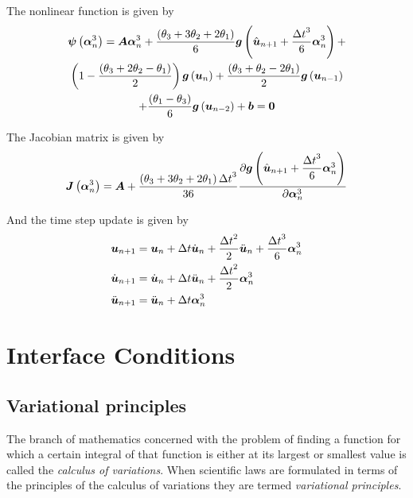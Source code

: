 The nonlinear function is given by
\begin{multline}
  \fnof{\vectr{\psi}}{\vectr{\alpha}^{3}_{n}}=\matr{A}\vectr{\alpha}^{3}_{n}+\dfrac{\pbrac{\theta_{3}+3\theta_{2}+2\theta_{1}}}{6}
  \fnof{\vectr{g}}{\hat{\vectr{u}}_{n+1}+\dfrac{{\Delta t}^{3}}{6}\vectr{\alpha}^{3}_{n}}+\\
  \pbrac{1-\dfrac{\pbrac{\theta_{3}+2\theta_{2}-\theta_{1}}}{2}}\fnof{\vectr{g}}{\vectr{u}_{n}}
  +\dfrac{\pbrac{\theta_{3}+\theta_{2}-2\theta_{1}}}{2}\fnof{\vectr{g}}{\vectr{u}_{n-1}} \\
  +\dfrac{\pbrac{\theta_{1}-\theta_{3}}}{6}\fnof{\vectr{g}}{\vectr{u}_{n-2}}
  +\vectr{b}=\vectr{0}
\end{multline}

The Jacobian matrix is given by
\begin{equation}
  \fnof{\matr{J}}{\vectr{\alpha}^{3}_{n}}=\matr{A}+\dfrac{\pbrac{\theta_{3}+3\theta_{2}+2\theta_{1}}{\Delta t}^{3}}{36}
  \delby{\fnof{\vectr{g}}{\hat{\vectr{u}}_{n+1}+\dfrac{{\Delta t}^{3}}{6}\vectr{\alpha}^{3}_{n}}}{\vectr{\alpha}^{3}_{n}}
\end{equation}

And the time step update is given by
\begin{equation}
  \begin{split}
    \boldsymbol{u}_{n+1} &= \boldsymbol{u}_{n}+\Delta t\dot{\boldsymbol{u}}_{n}
    +\dfrac{{\Delta t}^{2}}{2}\ddot{\boldsymbol{u}}_{n}
    +\dfrac{{\Delta t}^{3}}{6}\boldsymbol{\alpha}^{3}_{n} \\
    \dot{\boldsymbol{u}}_{n+1} &= \dot{\boldsymbol{u}}_{n}+\Delta t\ddot{\boldsymbol{u}}_{n}+\dfrac{{\Delta t}^{2}}{2}\boldsymbol{\alpha}^{3}_{n} \\
    \ddot{\boldsymbol{u}}_{n+1} &= \ddot{\boldsymbol{u}}_{n}+\Delta t\boldsymbol{\alpha}^{3}_{n} \\
  \end{split}
\end{equation}

\section{Interface Conditions}

\subsection{Variational principles}

The branch of mathematics concerned with the problem of finding a function for
which a certain integral of that function is either at its largest or smallest
value is called the \emph{calculus of variations}. When scientific laws are formulated in terms of the principles of the calculus
of variations they are termed \emph{variational principles}. 

